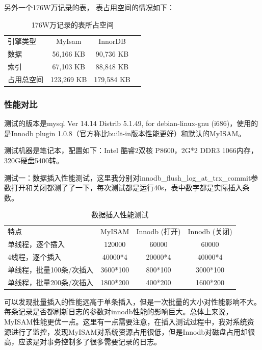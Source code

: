\documentclass[UTF8]{ctexart}
\begin{document}
另外一个176W万记录的表， 表占用空间的情况如下：
\begin{table}[]
\caption{176W万记录的表所占空间}
\vspace{20pt}
\centering
\begin{tabular}{|l|c|c|c|}
\hline
引擎类型        &        MyIsam &             InnorDB\\
数据           &       56,166 KB    &      90,736 KB\\
索引           &       67,103 KB   &       88,848 KB\\
占用总空间      &  123,269 KB     &   179,584 KB\\
 \hline       
 \end{tabular}
 \label{bs5}
\end{table}
\subsubsection{性能对比}
测试的版本是mysql  Ver 14.14 Distrib 5.1.49, for debian-linux-gnu (i686)，使用的是Innodb plugin 1.0.8（官方称比built-in版本性能更好）和默认的MyISAM。

测试机器是笔记本，配置如下：Intel 酷睿2双核 P8600，2G*2 DDR3 1066内存，320G硬盘5400转。

测试一：数据插入性能测试，这里我分别对innodb\_flush\_log\_at\_trx\_commit参数打开和关闭都测了了一下，每次测试都是运行40s，表中数字都是实际插入条数。
\begin{table}[]
\caption{数据插入性能测试}
\vspace{20pt}
\centering
\begin{tabular}{|l|c|c|c|}
\hline
特点           &   MyISAM           &      Innodb (打开)  &    Innodb (关闭)\\
单线程，逐个插入&    120000    &             60000         &     60000\\
4线程，逐个插入&    40000*4    &            20000*4       &     40000*4\\
单线程，批量100条/次插入&  3600*100   &            800*100      &      3000*100\\
单线程，批量200条/次插入 & 1800*200    &           400*200      &      1600*200\\
\hline       
\end{tabular}
\label{bs5}
\end{table}

可以发现批量插入的性能远高于单条插入，但是一次批量的大小对性能影响不大。每条记录是否都刷新日志的参数对innodb性能的影响巨大。总体上来说，MyISAM性能更优一点。这里有一点需要注意，在插入测试过程中，我对系统资源进行了监控，发现MyISAM对系统资源占用很低，但是Innodb对磁盘占用却很高，应该是对事务控制多了很多需要记录的日志。
\end{document}
